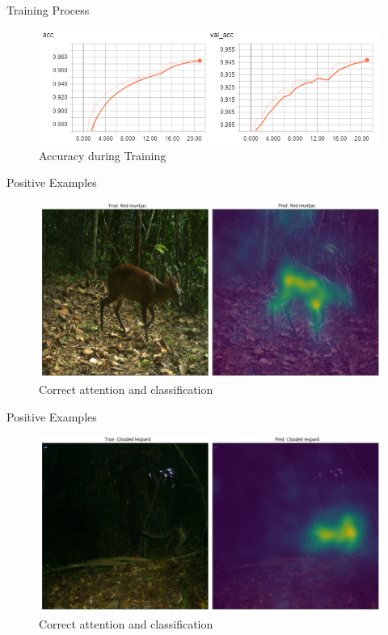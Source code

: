 \documentclass[10pt]{beamer}
\begin{document}
\begin{frame}{Training Process}
	\centering
	\begin{figure}
		\includegraphics[width=.9\columnwidth,height=\textheight,keepaspectratio]{images/acc.png}
		\caption{Accuracy during Training}
	\end{figure}
\end{frame}


\begin{frame}{Positive Examples}
	\centering
	\begin{figure}
		\includegraphics[width=\columnwidth]{images/Attention_right6.png}
		\caption{Correct attention and classification}
	\end{figure}
\end{frame}


\begin{frame}{Positive Examples}
	\centering
	\begin{figure}
		\includegraphics[width=\columnwidth]{images/Attention_right5.png}
		\caption{Correct attention and classification}
	\end{figure}
\end{frame}
\end{document}
